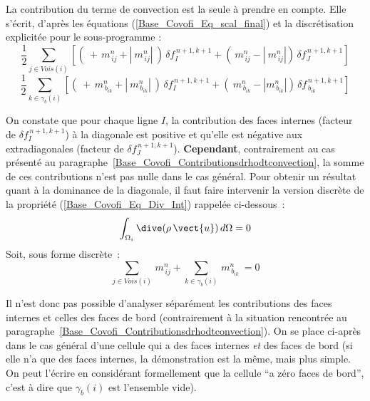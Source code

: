 La contribution du terme de convection est la seule \`a prendre en compte. Elle
s'\'ecrit, d'apr\`{e}s les \'{e}quations (\ref{Base_Covofi_Eq_scal_final}) et la discr\'{e}tisation
explicit\'{e}e pour le sous-programme  :
\begin{equation}\label{Base_Covofi_Eq_Sans_Faces_Int}
\displaystyle\frac{1}{2}\sum\limits_{j\in Vois(i)}\left[(\ +\,m_{\,ij}^n + |\
m_{\,ij}^n|\ )\,\delta f_I^{\,n+1,k+1}+ (\ m_{\,ij}^n - |\ m_{\,ij}^n|)\,\delta f_J^{\,n+1,k+1}\right]
\end{equation}
\begin{equation}\label{Base_Covofi_Eq_Sans_Faces_Bord}
\displaystyle\frac{1}{2}\sum\limits_{k\in {\gamma_b(i)}}\left[(\ +\,
m_{\,{b}_{ik}}^n + |\ m_{\,{b}_{ik}}^n|\ )\,\delta f_I^{\,n+1,k+1} + (\
m_{\,{b}_{ik}}^n - |m_{\,{b}_{ik}}^n|)\,\delta f_{\,{b}_{ik}}^{\,n+1,k+1}\right]
\end{equation}


On constate que pour chaque ligne $I$,  la contribution des faces
internes (facteur de $\delta f_I^{\,n+1,k+1}$) \`a la diagonale est positive et
qu'elle est n\'egative aux extradiagonales (facteur de $\delta
f_J^{\,n+1,k+1}$). {\bf Cependant}, contrairement au cas pr\'esent\'e au
paragraphe~\ref{Base_Covofi_Contributionsdrhodtconvection}, la
somme de ces contributions n'est pas nulle dans le cas g\'en\'eral. Pour obtenir
un r\'esultat quant \`a la dominance de la diagonale, il faut faire intervenir
la version discr\`ete de la propri\'et\'e (\ref{Base_Covofi_Eq_Div_Int})
rappel\'ee ci-dessous~: $$\displaystyle \int_{\Omega_i} \dive (\rho\,\vect{u})\,
d\Omega = 0$$
Soit, sous forme discr\`ete~:
\begin{equation}\label{Base_Covofi_Eq_Continuite_discrete}
\sum\limits_{j\in Vois(i)}\,m_{\,ij}^n
+ \sum\limits_{k\in {\gamma_b(i)}}\,m_{\,{b}_{ik}}^n\ = 0
\end{equation}

Il n'est donc pas possible d'analyser
s\'epar\'ement les contributions des faces internes et celles des faces
de bord (contrairement \`a la situation rencontr\'ee au
paragraphe~\ref{Base_Covofi_Contributionsdrhodtconvection}). On se place ci-apr\`es dans le
cas g\'en\'eral d'une cellule qui a des faces internes {\em et} des faces de
bord (si elle n'a que des faces internes, la d\'emonstration est la m\^eme, mais
plus simple. On peut l'\'ecrire en consid\'erant formellement que la cellule
``a z\'ero faces de bord'', c'est \`a dire que $\gamma_b(i)$ est l'ensemble vide). \\

